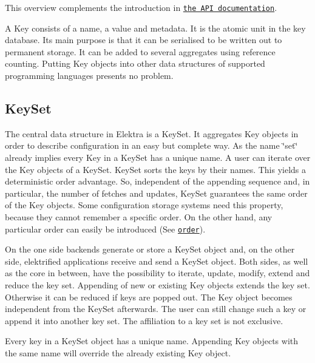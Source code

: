 This overview complements the introduction in \href{http://doc.libelektra.org/api/current/html/}{\tt the A\+P\+I documentation}.

A {\ttfamily Key} consists of a name, a value and metadata. It is the atomic unit in the key database. Its main purpose is that it can be serialised to be written out to permanent storage. It can be added to several aggregates using reference counting. Putting {\ttfamily Key} objects into other data structures of supported programming languages presents no problem.

\subsection*{Key\+Set}

The central data structure in Elektra is a {\ttfamily Key\+Set}. It aggregates {\ttfamily Key} objects in order to describe configuration in an easy but complete way. As the name \char`\"{}set\char`\"{} already implies every {\ttfamily Key} in a {\ttfamily Key\+Set} has a unique name. A user can iterate over the {\ttfamily Key} objects of a {\ttfamily Key\+Set}. {\ttfamily Key\+Set} sorts the keys by their names. This yields a deterministic order advantage. So, independent of the appending sequence and, in particular, the number of fetches and updates, {\ttfamily Key\+Set} guarantees the same order of the {\ttfamily Key} objects. Some configuration storage systems need this property, because they cannot remember a specific order. On the other hand, any particular order can easily be introduced (See \href{/home/markus/Projekte/Elektra/current/doc/METADATA.ini}{\tt order}).

On the one side backends generate or store a {\ttfamily Key\+Set} object and, on the other side, elektrified applications receive and send a {\ttfamily Key\+Set} object. Both sides, as well as the core in between, have the possibility to iterate, update, modify, extend and reduce the key set. Appending of new or existing {\ttfamily Key} objects extends the key set. Otherwise it can be reduced if keys are popped out. The {\ttfamily Key} object becomes independent from the {\ttfamily Key\+Set} afterwards. The user can still change such a key or append it into another key set. The affiliation to a key set is not exclusive.

Every key in a {\ttfamily Key\+Set} object has a unique name. Appending {\ttfamily Key} objects with the same name will override the already existing {\ttfamily Key} object.

